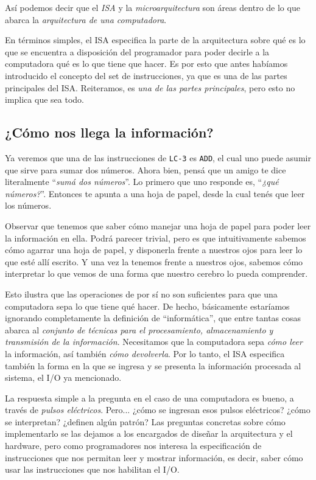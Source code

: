 \documentclass[a4paper, titlepage]{report}
\begin{document}
	Así podemos decir que el \textit{ISA} y la \textit{microarquitectura} son áreas dentro de lo que abarca la \textit{arquitectura de una computadora}.
	
	En términos simples, el ISA especifica la parte de la arquitectura sobre qué es lo que se encuentra a disposición del programador para poder decirle a la computadora qué es lo que tiene que hacer. Es por esto que antes habíamos introducido el concepto del set de instrucciones, ya que es una de las partes principales del ISA. Reiteramos, es \textit{una de las partes principales}, pero esto no implica que sea todo.\\
	
	\subsection{¿Cómo nos llega la información?}
	\label{sec:isa-io}
	
	Ya veremos que una de las instrucciones de \texttt{LC-3} es \texttt{ADD}, el cual uno puede asumir que sirve para sumar dos números. Ahora bien, pensá que un amigo te dice literalmente ``\textit{sumá dos números}''. Lo primero que uno responde es, ``\textit{¿qué números?}''. Entonces te apunta a una hoja de papel, desde la cual tenés que leer los números.
	
	Observar que tenemos que saber cómo manejar una hoja de papel para poder leer la información en ella. Podrá parecer trivial, pero es que intuitivamente sabemos cómo agarrar una hoja de papel, y disponerla frente a nuestros ojos para leer lo que esté allí escrito. Y una vez la tenemos frente a nuestros ojos, sabemos cómo interpretar lo que vemos de una forma que nuestro cerebro lo pueda comprender.
	
	Esto ilustra que las operaciones de por sí no son suficientes para que una computadora sepa lo que tiene qué hacer. De hecho, básicamente estaríamos ignorando completamente la definición de ``informática'', que entre tantas cosas abarca al \textit{conjunto de técnicas para el procesamiento, almacenamiento y transmisión de la información}. Necesitamos que la computadora sepa \textit{cómo leer} la información, así también \textit{cómo devolverla}. Por lo tanto, el ISA especifica también la forma en la que se ingresa y se presenta la información procesada al sistema, el I/O ya mencionado.
	
	La respuesta simple a la pregunta en el caso de una computadora es bueno, a través de \textit{pulsos eléctricos}. Pero... ¿cómo se ingresan esos pulsos eléctricos? ¿cómo se interpretan? ¿definen algún patrón? Las preguntas concretas sobre cómo implementarlo se las dejamos a los encargados de diseñar la arquitectura y el hardware, pero como programadores nos interesa la especificación de instrucciones que nos permitan leer y mostrar información, es decir, saber cómo usar las instrucciones que nos habilitan el I/O.
	
\end{document}
